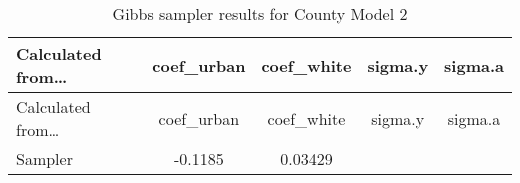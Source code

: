 \documentclass[12pt,twoside]{reedthesis}
\begin{document}
  \begin{longtable}[]{@{}lcccc@{}}
  \caption{Gibbs sampler results for County Model 2
  \label{tab:gibbs_2}}\tabularnewline
  \toprule
  \begin{minipage}[b]{0.25\columnwidth}\raggedright\strut
  Calculated from\ldots{}\strut
  \end{minipage} & \begin{minipage}[b]{0.16\columnwidth}\centering\strut
  coef\_urban\strut
  \end{minipage} & \begin{minipage}[b]{0.16\columnwidth}\centering\strut
  coef\_white\strut
  \end{minipage} & \begin{minipage}[b]{0.12\columnwidth}\centering\strut
  sigma.y\strut
  \end{minipage} & \begin{minipage}[b]{0.12\columnwidth}\centering\strut
  sigma.a\strut
  \end{minipage}\tabularnewline
  \midrule
  \endfirsthead
  \toprule
  \begin{minipage}[b]{0.25\columnwidth}\raggedright\strut
  Calculated from\ldots{}\strut
  \end{minipage} & \begin{minipage}[b]{0.16\columnwidth}\centering\strut
  coef\_urban\strut
  \end{minipage} & \begin{minipage}[b]{0.16\columnwidth}\centering\strut
  coef\_white\strut
  \end{minipage} & \begin{minipage}[b]{0.12\columnwidth}\centering\strut
  sigma.y\strut
  \end{minipage} & \begin{minipage}[b]{0.12\columnwidth}\centering\strut
  sigma.a\strut
  \end{minipage}\tabularnewline
  \midrule
  \endhead
  \begin{minipage}[t]{0.25\columnwidth}\raggedright\strut
  Sampler\strut
  \end{minipage} & \begin{minipage}[t]{0.16\columnwidth}\centering\strut
  -0.1185\strut
  \end{minipage} & \begin{minipage}[t]{0.16\columnwidth}\centering\strut
  0.03429\strut
  \end{minipage} & \begin{minipage}[t]{0.12\columnwidth}\centering\strut

\end{minipage}
\end{longtable}
\end{document}

